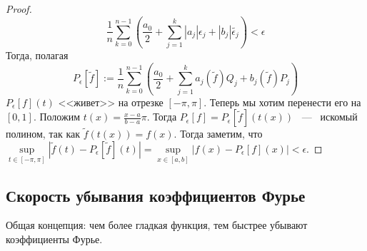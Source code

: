 \begin{proof}
    $$
    \dfrac{1}{n}\sum\limits_{k = 0}^{n - 1} (\dfrac{a_0}{2} + \sum\limits_{j = 1}^{k}|a_j|\epsilon_j + |b_j|\tilde{\epsilon_j}) < \epsilon
    $$
    Тогда, полагая
    $$
    P_{\epsilon}[\tilde{f}] := \frac{1}{n} \sum\limits_{k = 0}^{n - 1} (\frac{a_0}{2} + \sum\limits_{j = 1}^{k} a_j(\tilde{f}) Q_j + b_j(\tilde{f}) P_j)
    $$
    $P_{\epsilon}[f](t)$ <<живет>> на отрезке $[-\pi, \pi]$. Теперь мы хотим перенести его на $[0, 1]$. \newline
    Положим $t(x) = \frac{x - a}{b - a}\pi$. Тогда $P_{\epsilon}[f] = P_{\epsilon}[\tilde{f}](t(x))$ ~---~ искомый полином, так как $\tilde{f}(t(x)) = f(x)$. Тогда заметим, что $\sup\limits_{t \in [-\pi, \pi]} |\tilde{f}(t) - P_{\epsilon}[\tilde{f}](t)| = \sup\limits_{x \in [a, b]} | f(x) - P_{\epsilon}[f](x)| < \epsilon.$
\end{proof}

\subsection{Скорость убывания коэффициентов Фурье}
Общая концепция: чем более гладкая функция, тем быстрее убывают коэффициенты Фурье. 

